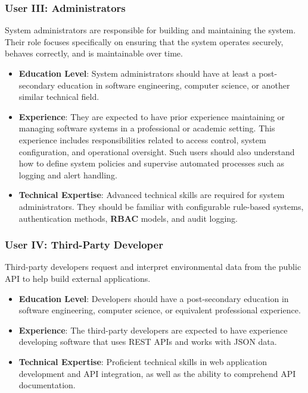 \documentclass[]{article}
\begin{document}
\subsubsection{User III: Administrators}
System administrators are responsible for building and maintaining the system. Their role focuses specifically on ensuring that the system operates securely, behaves correctly, and is maintainable over time.
\begin{itemize}
    \item \textbf{Education Level}: System administrators should have at least a post-secondary education in software engineering, computer science, or another similar technical field.
    \item \textbf{Experience}: They are expected to have prior experience maintaining or managing software systems in a professional or academic setting. This experience includes responsibilities related to access control, system configuration, and operational oversight. Such users should also understand how to define system policies and supervise automated processes such as logging and alert handling. 
    \item \textbf{Technical Expertise}: Advanced technical skills are required for system administrators. They should be familiar with configurable rule-based systems, authentication methods, \textbf{RBAC} models, and audit logging.
\end{itemize}

\subsubsection{User IV: Third-Party Developer}
Third-party developers request and interpret environmental data from the public API to help build external applications. 
\begin{itemize}
    \item \textbf{Education Level}: Developers should have a post-secondary education in software engineering, computer science, or equivalent professional experience.
    \item \textbf{Experience}: The third-party developers are expected to have experience developing software that uses REST APIs and works with JSON data.
    \item \textbf{Technical Expertise}: Proficient technical skills in web application development and API integration, as well as the ability to comprehend API documentation.
\end{itemize}
\end{document}
